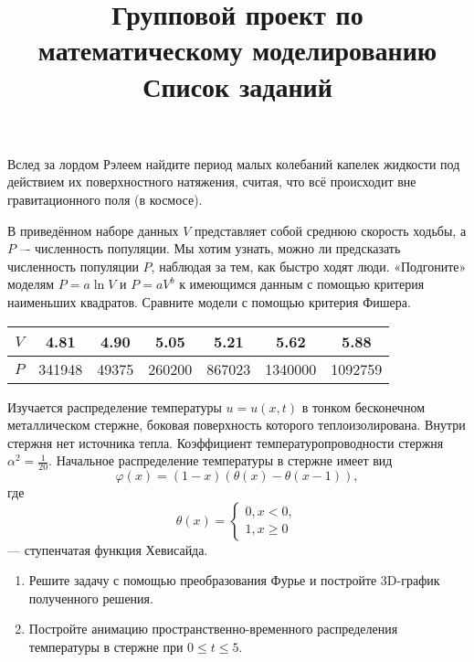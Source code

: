 


\title{Групповой проект по математическому моделированию\\
\vspace{10pt}
\Large Список заданий}
\date{}


\maketitle

 Вслед за лордом Рэлеем найдите период малых колебаний капелек жидкости под действием их поверхностного натяжения, считая, что всё происходит вне гравитационного поля (в космосе).\par

 В приведённом наборе данных $V$ представляет собой среднюю скорость ходьбы, а $P$ –- численность популяции. Мы хотим узнать, можно ли предсказать численность популяции $P$, наблюдая за тем, как быстро ходят люди. «Подгоните» моделям $P=a \ln V$ и $P=aV^b$ к имеющимся данным с помощью критерия наименьших квадратов. Сравните модели с помощью критерия Фишера.\par

\begin{center}
\begin{tabular}{ |c|c|c|c|c|c|c| }
\hline
$V$ & 4.81 & 4.90 & 5.05 & 5.21 & 5.62 & 5.88\\
\hline
$P$ & 341948 & 49375 & 260200 & 867023 & 1340000 & 1092759\\
\hline
\end{tabular}
\end{center}

 Изучается распределение температуры $u=u(x, t)$ в тонком бесконечном металлическом стержне, боковая поверхность которого теплоизолирована. Внутри стержня нет источника тепла. Коэффициент температуропроводности стержня $\alpha^2 = \frac{1}{20}$. Начальное распределение температуры в стержне имеет вид
\[ \varphi (x)=(1-x)(\theta (x)- \theta (x-1)), \]
где 
\[
\theta (x) =
\begin{cases}
0, x < 0,\\
1, x \ge 0
\end{cases}
\]
--- ступенчатая функция Хевисайда.\\
 \begin{enumerate}
 \item Решите задачу с помощью преобразования Фурье и постройте 3D-график полученного решения.
\item Постройте анимацию пространственно-временного распределения температуры в стержне при $0 \le t \le 5$.
\end{enumerate}

